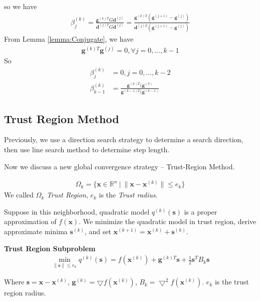 \documentclass[runningheads]{llncs}
\begin{document}
    so we have
    \begin{align}
        \beta_j^{(k)} = \frac{\mathbf{g}^{(k)T} G \mathbf{d}^{(j)}}
        {\mathbf{d}^{(j)T} G \mathbf{d}^{(j)}}
        = \frac{\mathbf{g}^{(k)T} (\mathbf{g}^{(j+1)} - \mathbf{g}^{(j)})}
        {\mathbf{d}^{(j)T}(\mathbf{g}^{(j+1)} - \mathbf{g}^{(j)})}
    \end{align}
    From Lemma \ref{lemma:Conjugate}, we have 
    \begin{align}
        \mathbf{g}^{(k)T}\mathbf{g}^{(j)} = 0, \forall j = 0,..., k-1
    \end{align}
    So
    \begin{align}
        \beta_j^{(k)} &= 0, j = 0,...,k-2 \\
        \beta_{k-1}^{(k)} &= \frac{\mathbf{g}^{(k)T} (\mathbf{g}^{(k)}}{\mathbf{g}^{(k-1)T} (\mathbf{g}^{(k-1)}}
    \end{align}

\subsection{Trust Region Method}
Previously, we use a direction search strategy
to determine a search direction, then use line
search method to determine step length.
\par
Now we discuss a new global convergence strategy --
Trust-Region Method.
\begin{definition}
    \begin{align}
        \Omega_k = \{ \mathbf{x} \in \mathbb{R}^n \ | \ \parallel
        \mathbf{x} - \mathbf{x}^{(k)} \parallel \leq e_k  \}
    \end{align}
    We called $\Omega_k$ \emph{Trust Region}, $e_k$ is the \emph{Trust radius}.
\end{definition}

Suppose in this neighborhood, quadratic model $q^{(k)}(\mathbf{s})$
is a proper approximation of $f(\mathbf{x})$.
We minimize the quadratic model in trust region, derive
approximate minima $\mathbf{s}^{(k)}$,
and set $\mathbf{x}^{(k+1)} = \mathbf{x}^{(k)} + \mathbf{s}^{(k)}$.
\par
\noindent\textbf{Trust Region Subproblem}
\begin{align}
    \min_{\parallel \mathbf{s} \parallel \leq e_k} q^{(k)}(\mathbf{s})
     = f(\mathbf{x}^{(k)}) + \mathbf{g}^{(k)T}\mathbf{s}
    + \frac{1}{2} \mathbf{s}^T B_k \mathbf{s}
\end{align}

Where $\mathbf{s} = \mathbf{x} - \mathbf{x}^{(k)}$,
$\mathbf{g}^{(k)} = \bigtriangledown f(\mathbf{x}^{(k)})$,
$B_k = \bigtriangledown^2 f(\mathbf{x}^{(k)})$.
$e_k$ is the trust region radius.
\end{document}
